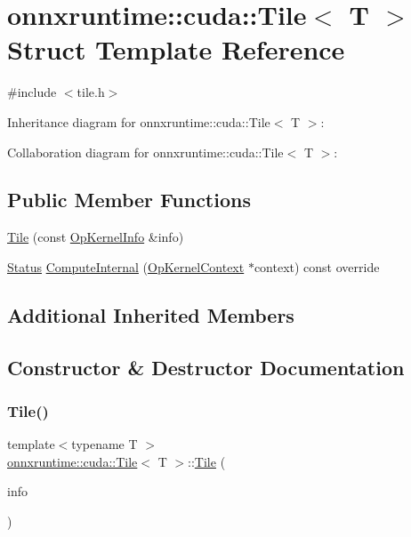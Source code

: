 \hypertarget{structonnxruntime_1_1cuda_1_1Tile}{}\section{onnxruntime\+:\+:cuda\+:\+:Tile$<$ T $>$ Struct Template Reference}
\label{structonnxruntime_1_1cuda_1_1Tile}


{\ttfamily \#include $<$tile.\+h$>$}



Inheritance diagram for onnxruntime\+:\+:cuda\+:\+:Tile$<$ T $>$\+:


Collaboration diagram for onnxruntime\+:\+:cuda\+:\+:Tile$<$ T $>$\+:
\subsection*{Public Member Functions}
\begin{DoxyCompactItemize}
\item 
\mbox{\hyperlink{structonnxruntime_1_1cuda_1_1Tile_a36afc156f1dc316c3f82339ff084c7d1}{Tile}} (const \mbox{\hyperlink{classonnxruntime_1_1OpKernelInfo}{Op\+Kernel\+Info}} \&info)
\item 
\mbox{\hyperlink{classonnxruntime_1_1common_1_1Status}{Status}} \mbox{\hyperlink{structonnxruntime_1_1cuda_1_1Tile_ad8a7d4e9aef2faec8891579f188ae6dd}{Compute\+Internal}} (\mbox{\hyperlink{classonnxruntime_1_1OpKernelContext}{Op\+Kernel\+Context}} $\ast$context) const override
\end{DoxyCompactItemize}
\subsection*{Additional Inherited Members}


\subsection{Constructor \& Destructor Documentation}
\mbox{\label{structonnxruntime_1_1cuda_1_1Tile_a36afc156f1dc316c3f82339ff084c7d1}} 
\subsubsection{\texorpdfstring{Tile()}{Tile()}}
{\footnotesize\ttfamily template$<$typename T $>$ \\
\mbox{\hyperlink{structonnxruntime_1_1cuda_1_1Tile}{onnxruntime\+::cuda\+::\+Tile}}$<$ T $>$\+::\mbox{\hyperlink{structonnxruntime_1_1cuda_1_1Tile}{Tile}} (\begin{DoxyParamCaption}\item[{const \mbox{\hyperlink{classonnxruntime_1_1OpKernelInfo}{Op\+Kernel\+Info}} \&}]{info }\end{DoxyParamCaption})\hspace{0.3cm}{\ttfamily [inline]}}



